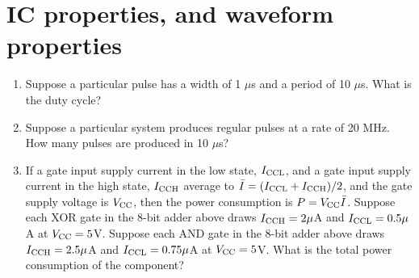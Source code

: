\documentclass[10pt]{article}
\begin{document}
\section{IC properties, and waveform properties}
\begin{enumerate}
\item Suppose a particular pulse has a width of 1 $\mu$s and a period of 10 $\mu$s.  What is the duty cycle? \\ \vspace{0.5cm}
\item Suppose a particular system produces regular pulses at a rate of 20 MHz.  How many pulses are produced in 10 $\mu$s? \\ \vspace{0.5cm}
\item If a gate input supply current in the low state, $I_{\rm CCL}$, and a gate input supply current in the high state, $I_{\rm CCH}$ average to $\bar{I} = (I_{\rm CCL} + I_{\rm CCH})/2$, and the gate supply voltage is $V_{\rm CC}$, then the power consumption is $P = V_{\rm CC} \bar{I}$.  Suppose each XOR gate in the 8-bit adder above draws $I_{\rm CCH} = 2 \mu$A and $I_{\rm CCL} = 0.5 \mu$A at $V_{\rm CC} = 5$V.  Suppose each AND gate in the 8-bit adder above draws $I_{\rm CCH} = 2.5 \mu$A and $I_{\rm CCL} = 0.75 \mu$A at $V_{\rm CC} = 5$V.  What is the total power consumption of the component? \\ \vspace{2cm}
\end{enumerate}
\end{document}
